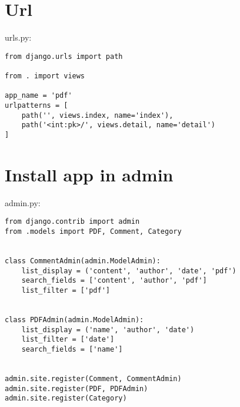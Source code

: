 \section{Url}

urls.py:
\lstset{language=Python}
\begin{lstlisting}
from django.urls import path

from . import views

app_name = 'pdf'
urlpatterns = [
    path('', views.index, name='index'),
    path('<int:pk>/', views.detail, name='detail')
]

\end{lstlisting}

\section{Install app in admin}

admin.py:
\begin{lstlisting}
from django.contrib import admin
from .models import PDF, Comment, Category

  
class CommentAdmin(admin.ModelAdmin):
    list_display = ('content', 'author', 'date', 'pdf')
    search_fields = ['content', 'author', 'pdf']
    list_filter = ['pdf']


class PDFAdmin(admin.ModelAdmin):
    list_display = ('name', 'author', 'date')
    list_filter = ['date']
    search_fields = ['name']


admin.site.register(Comment, CommentAdmin)
admin.site.register(PDF, PDFAdmin)
admin.site.register(Category)

\end{lstlisting}
